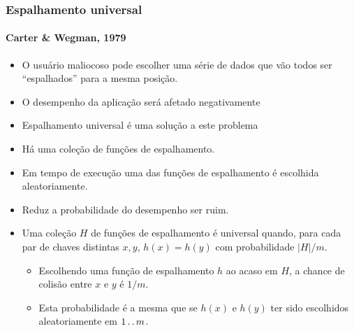 \documentclass{beamer}
\begin{document}
\begin{frame}

  \frametitle{Espalhamento universal}
  \framesubtitle{Carter \& Wegman, 1979}
  \begin{itemize}
    
  \item O usuário maliocoso pode escolher uma série de dados que vão todos 
    ser ``espalhados'' para a mesma posição.

  \item O desempenho da aplicação será afetado negativamente

  \item Espalhamento universal é uma solução a este problema

  \item Há uma coleção de funções de espalhamento.

  \item Em tempo de execução uma das funções de espalhamento é escolhida aleatoriamente.

  \item Reduz a probabilidade do desempenho ser ruim.

  \item Uma coleção $H$ de funções de espalhamento é \alert{universal} quando, para
    cada par de chaves distintas $x, y$, $h(x) = h(y)$ com probabilidade $|H|/m$. 

    \begin{itemize}

      \item Escolhendo uma função de espalhamento $h$ ao acaso em $H$, a 
        chance de colisão entre $x$ e $y$ é $1/m$. 

      \item Esta probabilidade é a mesma que se $h(x)$ e $h(y)$ ter sido
        escolhidos aleatoriamente em $1 \mathinner{\ldotp\ldotp} m$.

    \end{itemize}

  \end{itemize}

\end{frame}
\end{document}
